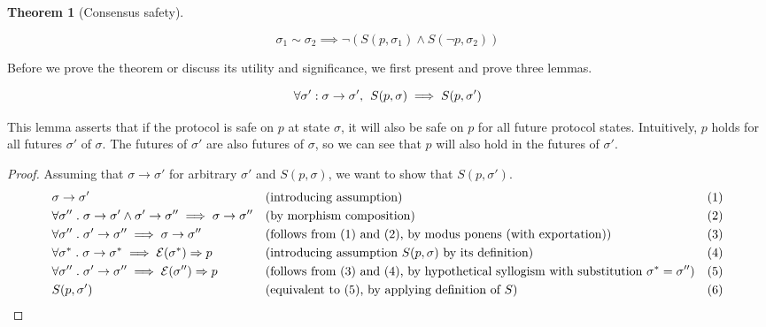 \documentclass{article}
\theoremstyle{definition}
\newtheorem{thm}{Theorem}
\begin{document}
\begin{thm}[Consensus safety]
\begin{description}
$$
\sigma_1 \sim \sigma_2 \implies \neg(S(p,\sigma_1) \land S(\neg{p},\sigma_2))
$$
\end{description}
\end{thm}

Before we prove the theorem or discuss its utility and significance, we first present and prove three lemmas.

\vspace{5mm}

\begin{lemma}
$$
\forall \sigma':\sigma \to \sigma',\hspace{1.5mm} S(p,\sigma) \implies S(p,\sigma')
$$
\end{lemma}

This lemma asserts that if the protocol is safe on $p$ at state $\sigma$, it will also be safe on $p$ for all future protocol states. Intuitively, $p$ holds for all futures $\sigma'$ of $\sigma$. The futures of $\sigma'$ are also futures of $\sigma$, so we can see that $p$ will also hold in the futures of $\sigma'$.

\begin{proof}
Assuming that $\sigma \to \sigma'$ for arbitrary $\sigma'$ and $S(p, \sigma)$, we want to show that $S(p, \sigma')$.
  \begin{align*}
    &\sigma \to \sigma' &&\text{(introducing assumption)}   &&\text{(1)}\\ 
    &\forall \sigma'' \hspace{1mm}.\hspace{1mm}\sigma \to \sigma' \land \sigma' \to \sigma'' \implies \sigma \to \sigma'' &&\text{(by morphism composition)}   &&\text{(2)}\\
    &\forall \sigma'' \hspace{1mm}.\hspace{1mm}\sigma' \to \sigma'' \implies \sigma \to \sigma'' &&\text{(follows from (1) and (2), by modus ponens (with exportation))}   &&\text{(3)}\\
    &\forall \sigma^* \hspace{1mm}.\hspace{1mm}\sigma \to \sigma^* \implies \mathcal{E}(\sigma^*) \Rightarrow p &&\text{(introducing assumption $S(p, \sigma)$ by its definition) }   &&\text{(4)} \\
    &\forall \sigma'' \hspace{1mm}.\hspace{1mm}\sigma' \to \sigma'' \implies \mathcal{E}(\sigma'') \Rightarrow p &&\text{(follows from (3) and (4), by hypothetical syllogism with substitution $\sigma^* = \sigma''$)}   &&\text{(5)}\\
    &S(p, \sigma')  \hspace{5mm} \qedhere &&\text{(equivalent to (5), by applying definition of $S$) }   &&\text{(6)}
  \end{align*}
\end{proof}
\end{document}
